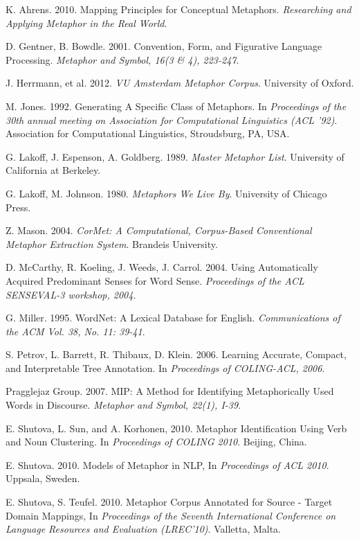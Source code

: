 \documentclass[12pt]{article}
\begin{document}
\newpage
\begin{thebibliography}{9}

  K. Ahrens. 2010.
  Mapping Principles for Conceptual Metaphors.
  \emph{Researching and Applying Metaphor in the Real World}.

  D. Gentner, B. Bowdle. 2001.
  Convention, Form, and Figurative Language Processing.
  \emph{Metaphor and Symbol, 16(3 \& 4), 223-247}.

  J. Herrmann, et al.  2012.
  \emph{VU Amsterdam Metaphor Corpus}.
  University of Oxford.

  M. Jones. 1992.
  Generating A Specific Class of Metaphors.
  In \emph{Proceedings of the 30th annual meeting on Association for Computational Linguistics (ACL '92)}. Association for Computational Linguistics, Stroudsburg, PA, USA.
 
  G. Lakoff, J. Espenson, A. Goldberg. 1989.
  \emph{Master Metaphor List}.
  University of California at Berkeley.
  
  G. Lakoff, M. Johnson. 1980.
  \emph{Metaphors We Live By}.
  University of Chicago Press.

  Z. Mason. 2004.
  \emph{CorMet: A Computational, Corpus-Based Conventional Metaphor Extraction System}.
  Brandeis University.

  D. McCarthy, R. Koeling, J. Weeds, J. Carrol. 2004.
  Using Automatically Acquired Predominant Senses for Word Sense.
  \emph{Proceedings of the ACL SENSEVAL-3 workshop, 2004}.

  G. Miller. 1995.
  WordNet: A Lexical Database for English.
  \emph{Communications of the ACM Vol. 38, No. 11: 39-41}.

  S. Petrov, L. Barrett, R. Thibaux, D. Klein. 2006.
  Learning Accurate, Compact, and Interpretable Tree Annotation.
  In \emph{Proceedings of COLING-ACL, 2006}.

  Pragglejaz Group. 2007.
  MIP: A Method for Identifying Metaphorically Used Words in Discourse.
  \emph{Metaphor and Symbol, 22(1), I-39}.

  E. Shutova, L. Sun, and A. Korhonen, 2010.
  Metaphor Identification Using Verb and Noun Clustering.
  In \emph{Proceedings of COLING 2010}.
  Beijing, China.
  
  E. Shutova. 2010.
  Models of Metaphor in NLP,
  In \emph{Proceedings of ACL 2010}.
  Uppsala, Sweden.

 E. Shutova, S. Teufel. 2010.
 Metaphor Corpus Annotated for Source - Target Domain Mappings,
 In \emph{Proceedings of the Seventh International Conference on Language Resources and Evaluation (LREC'10)}.
 Valletta, Malta.

\end{thebibliography}
\end{document}
